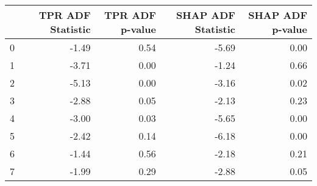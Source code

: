 \begin{tabular}{lrrrr}
\toprule
 & TPR ADF Statistic & TPR ADF p-value & SHAP ADF Statistic & SHAP ADF p-value \\
\midrule
0 & -1.49 & 0.54 & -5.69 & 0.00 \\
1 & -3.71 & 0.00 & -1.24 & 0.66 \\
2 & -5.13 & 0.00 & -3.16 & 0.02 \\
3 & -2.88 & 0.05 & -2.13 & 0.23 \\
4 & -3.00 & 0.03 & -5.65 & 0.00 \\
5 & -2.42 & 0.14 & -6.18 & 0.00 \\
6 & -1.44 & 0.56 & -2.18 & 0.21 \\
7 & -1.99 & 0.29 & -2.88 & 0.05 \\
\bottomrule
\end{tabular}
